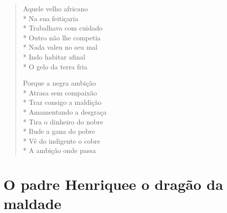 \begin{verse}
Aquele velho africano\\*
Na sua feitiçaria\\*
Trabalhava com cuidado\\*
Outro não lhe competia\\*
Nada valeu no seu mal\\*
Indo habitar afinal\\*
O gelo da terra fria

Porque a negra ambição\\*
Atrasa sem compaixão\\*
Traz consigo a maldição\\*
Amamentando a desgraça\\*
Tira o dinheiro do nobre\\*
Ilude a gana do pobre\\*
Vê do indigente o cobre\\*
A ambição onde passa
\end{verse}

\chapter[O padre Henrique e o dragão da maldade]{O padre Henrique\break e o dragão da maldade}

